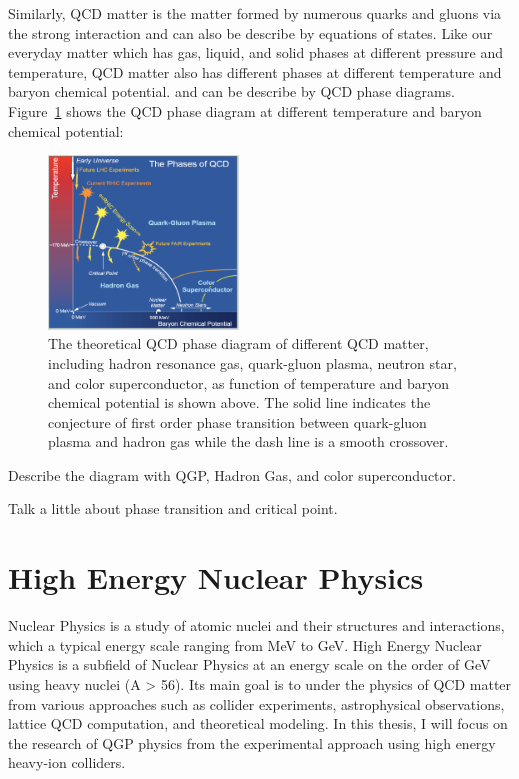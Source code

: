 Similarly, QCD matter is the matter formed by numerous quarks and gluons via the strong interaction and can also be describe by equations of states. Like our everyday matter which has gas, liquid, and solid phases at different pressure and temperature, QCD matter also has different phases at different temperature and baryon chemical potential. and can be describe by QCD phase diagrams. Figure~\ref{QCDPhaseDiagram} shows the QCD phase diagram at different temperature and baryon chemical potential:

\begin{figure}[hbtp]
\begin{center}
\includegraphics[width=0.45\textwidth]{Figures/Chapter1/QCDPhaseDiagram.png}
\caption{The theoretical QCD phase diagram of different QCD matter, including hadron resonance gas, quark-gluon plasma, neutron star, and color superconductor, as function of temperature and baryon chemical potential is shown above. The solid line indicates the conjecture of first order phase transition between quark-gluon plasma and hadron gas while the dash line is a smooth crossover.}
\label{QCDPhaseDiagram}
\end{center}
\end{figure} 

Describe the diagram with QGP, Hadron Gas, and color superconductor.

Talk a little about phase transition and critical point.

\section{High Energy Nuclear Physics}

Nuclear Physics is a study of atomic nuclei and their structures and interactions, which a typical energy scale ranging from MeV to GeV. High Energy Nuclear Physics is a subfield of Nuclear Physics at an energy scale on the order of GeV using heavy nuclei (A > 56). Its main goal is to under the physics of QCD matter from various approaches such as collider experiments, astrophysical observations, lattice QCD computation, and theoretical modeling. In this thesis, I will focus on the research of QGP physics from the experimental approach using high energy heavy-ion colliders.

